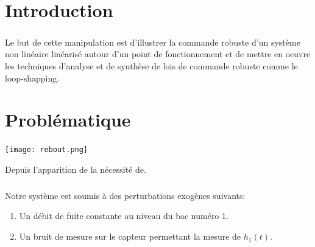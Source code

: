 \documentclass[12pt, a4paper, openany]{report}
\begin{document}
\tableofcontents
\listoffigures
\listoftables



\chapter*{Introduction}
 
 \paragraph{}
  Le but de cette manipulation est d'illustrer la commande robuste d'un système non linéaire linéarisé autour d'un point de fonctionnement et de mettre en oeuvre les techniques d'analyse et de synthèse de lois de commande robuste comme le loop-shapping.\\
                                                      



\chapter*{Problématique}
 
 \begin{center}
   \texttt{[image: rebout.png]}
   \label{fig1}
 \end{center}   

   
Depuis l’apparition de la nécessité de. \\

\paragraph{}   
Notre système est soumis à des perturbations exogènes suivants:
        
  \begin{enumerate}
      \item Un débit de fuite constante au niveau du bac numéro 1.
      \item Un bruit de mesure sur le capteur permettant la mesure de $h_{1}(t)$.
  \end{enumerate}
   
\end{document}
